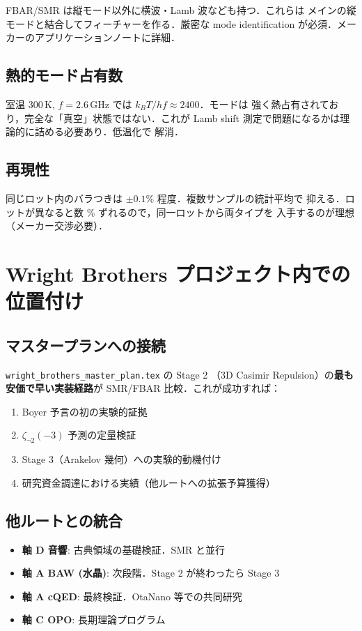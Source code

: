\documentclass[11pt,a4paper]{article}
\begin{document}
FBAR/SMR は縦モード以外に横波・Lamb 波なども持つ．これらは
メインの縦モードと結合してフィーチャーを作る．厳密な mode
identification が必須．メーカーのアプリケーションノートに詳細．

\subsection{熱的モード占有数}

室温 300\,K, $f = 2.6$\,GHz では $k_B T/h f \approx 2400$．モードは
強く熱占有されており，完全な「真空」状態ではない．これが Lamb
shift 測定で問題になるかは理論的に詰める必要あり．低温化で
解消．

\subsection{再現性}

同じロット内のバラつきは $\pm 0.1\%$ 程度．複数サンプルの統計平均で
抑える．ロットが異なると数 \% ずれるので，同一ロットから両タイプを
入手するのが理想（メーカー交渉必要）．

\section{Wright Brothers プロジェクト内での位置付け}

\subsection{マスタープランへの接続}

\texttt{wright\_brothers\_master\_plan.tex} の Stage 2
（3D Casimir Repulsion）の\textbf{最も安価で早い実装経路}が
SMR/FBAR 比較．これが成功すれば：

\begin{enumerate}
\item Boyer 予言の初の実験的証拠
\item $\zeta_{\neg 2}(-3)$ 予測の定量検証
\item Stage 3（Arakelov 幾何）への実験的動機付け
\item 研究資金調達における実績（他ルートへの拡張予算獲得）
\end{enumerate}

\subsection{他ルートとの統合}

\begin{itemize}
\item \textbf{軸 D 音響}: 古典領域の基礎検証．SMR と並行
\item \textbf{軸 A BAW (水晶)}: 次段階．Stage 2 が終わったら Stage 3
\item \textbf{軸 A cQED}: 最終検証．OtaNano 等での共同研究
\item \textbf{軸 C OPO}: 長期理論プログラム
\end{itemize}
\end{document}
